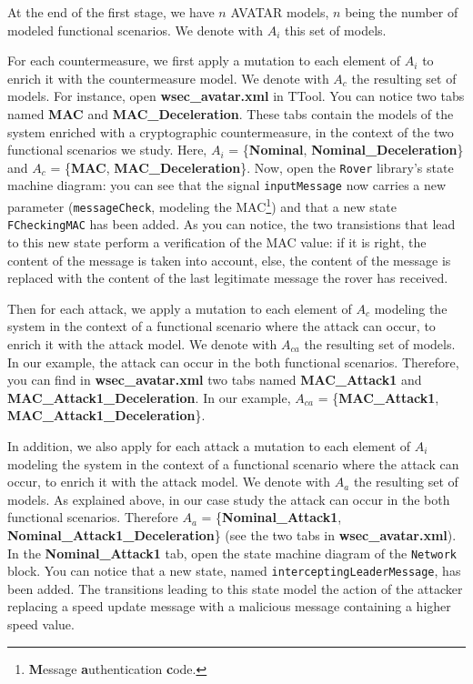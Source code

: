 \documentclass{article}
\begin{document}
At the end of the first stage, we have $n$ AVATAR models, $n$ being the number of modeled functional scenarios. We denote with $A_i$ this set of models.

For each countermeasure, we first apply a mutation to each element of $A_i$ to enrich it with the countermeasure model. We denote with $A_c$ the resulting set of models. For instance, open \textbf{wsec\_avatar.xml} in TTool. You can notice two tabs named \textbf{MAC} and \textbf{MAC\_Deceleration}. These tabs contain the models of the system enriched with a cryptographic countermeasure, in the context of the two functional scenarios we study. Here, $A_i$ = \{\textbf{Nominal}, \textbf{Nominal\_Deceleration}\} and $A_c$ = \{\textbf{MAC}, \textbf{MAC\_Deceleration}\}. Now, open the \texttt{Rover} library's state machine diagram: you can see that the signal \texttt{inputMessage} now carries a new parameter (\texttt{messageCheck}, modeling the MAC\footnote{\textbf{M}essage \textbf{a}uthentication \textbf{c}ode.}) and that a new state \texttt{FCheckingMAC} has been added. As you can notice, the two transistions that lead to this new state perform a verification of the MAC value: if it is right, the content of the message is taken into account, else, the content of the message is replaced with the content of the last legitimate message the rover has received.

Then for each attack, we apply a mutation to each element of $A_c$ modeling the system in the context of a functional scenario where the attack can occur, to enrich it with the attack model. We denote with $A_{c a}$ the resulting set of models. In our example, the attack can occur in the both functional scenarios. Therefore, you can find in \textbf{wsec\_avatar.xml} two tabs named \textbf{MAC\_Attack1} and \textbf{MAC\_Attack1\_Deceleration}. In our example, $A_{c a}$ = \{\textbf{MAC\_Attack1}, \textbf{MAC\_Attack1\_Deceleration}\}.

In addition, we also apply for each attack a mutation to each element of $A_i$ modeling the system in the context of a functional scenario where the attack can occur, to enrich it with the attack model. We denote with $A_a$ the resulting set of models. As explained above, in our case study the attack can occur in the both functional scenarios. Therefore $A_a$ = \{\textbf{Nominal\_Attack1}, \textbf{Nominal\_Attack1\_Deceleration}\} (see the two tabs in \textbf{wsec\_avatar.xml}). In the \textbf{Nominal\_Attack1} tab, open the state machine diagram of the \texttt{Network} block. You can notice that a new state, named \texttt{interceptingLeaderMessage}, has been added. The transitions leading to this state model the action of the attacker replacing a speed update message with a malicious message containing a higher speed value.
\end{document}
